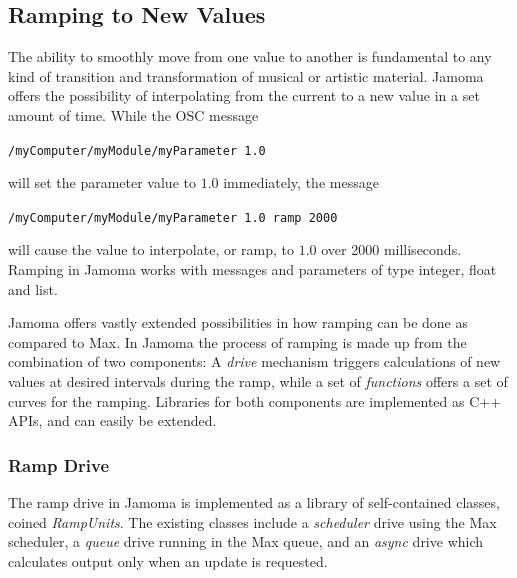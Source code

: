 \documentclass{NIME-alternate}
\begin{document}

\subsection{Ramping to New Values} %
\label{sub:ramping_to_new_values}

The ability to smoothly move from one value to another is fundamental to any kind of transition and transformation of musical or artistic material. Jamoma offers the possibility of interpolating from the current to a new value in a set amount of time. While the OSC message

\texttt{/myComputer/myModule/myParameter 1.0}

\noindent
will set the parameter value to $1.0$ immediately, the message

\texttt{/myComputer/myModule/myParameter 1.0 ramp 2000}

\noindent
will cause the value to interpolate, or ramp, to $1.0$ over 2000 milliseconds. Ramping in Jamoma works with messages and parameters of type integer, float and list.

Jamoma offers vastly extended possibilities in how ramping can be done as compared to Max. In Jamoma the process of ramping is made up from the combination of two components: A \emph{drive} mechanism triggers calculations of new values at desired intervals during the ramp, while a set of \emph{functions} offers a set of curves for the ramping. Libraries for both components are implemented as C++ APIs, and can easily be extended.


\subsubsection{Ramp Drive} %
\label{ssub:the_ramp_lib}

The ramp drive in Jamoma is implemented as a library of self-contained classes, coined \emph{RampUnits}.  The existing classes include a \emph{scheduler} drive using the Max scheduler, a \emph{queue} drive running in the Max queue, and an \emph{async} drive which calculates output only when an update is requested.


\end{document}
